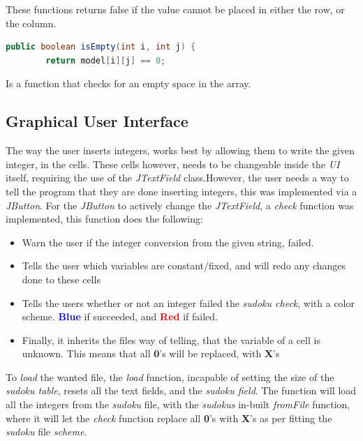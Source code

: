 \documentclass[a4paper,10pt]{article}
\begin{document}
These functions returns false if the value cannot be placed in either the row, or the column.

\begin{lstlisting}[language=java]
public boolean isEmpty(int i, int j) {
        return model[i][j] == 0;
\end{lstlisting}

Is a function that checks for an empty space in the array.

\newpage

\subsection{Graphical User Interface}

The way the user inserts integers, works best by allowing them to write the given integer, in the cells. These cells however, needs to be changeable inside the \textit{UI} itself, requiring the use of the \textit{JTextField} class.However, the user needs a way to tell the program that they are done inserting integers, this was implemented via a \textit{JButton}. For the \textit{JButton} to actively change the \textit{JTextField}, a \textit{check} function was implemented, this function does the following:

\begin{itemize}
\item Warn the user if the integer conversion from the given string, failed.

\item Tells the user which variables are constant/fixed, and will redo any changes done to these cells

\item Tells the users whether or not an integer failed the \textit{sudoku check}, with a color scheme. \textcolor{blue}{\textbf{Blue}} if succeeded, and \textcolor{red}{\textbf{Red}} if failed.

\item Finally, it inherits the files way of telling, that the variable of a cell is unknown. This means that all \textbf{0}'s will be replaced, with \textbf{X}'s
\end{itemize}

To \textit{load} the wanted file, the \textit{load} function, incapable of setting the size of the \textit{sudoku table}, resets all the text fields, and the \textit{sudoku field}. The function will load all the integers from the \textit{sudoku} file, with the \textit{sudokus} in-built \textit{fromFile} function, where it will let the \textit{check} function replace all \textbf{0}'s with \textbf{X}'s as per fitting the \textit{sudoku} file \textit{scheme}.
\end{document}
